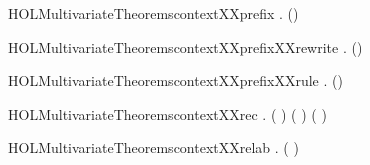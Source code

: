 \newcommand{\HOLMultivariateTheoremscontextXXparXXrule}{\UseVerbatim{HOLMultivariateTheoremscontextXXparXXrule}}
\begin{SaveVerbatim}{HOLMultivariateTheoremscontextXXprefix}
\HOLTokenTurnstile{} \HOLSymConst{\HOLTokenForall{}}  .   () \HOLSymConst{\HOLTokenImp{}}   
\end{SaveVerbatim}
\newcommand{\HOLMultivariateTheoremscontextXXprefix}{\UseVerbatim{HOLMultivariateTheoremscontextXXprefix}}
\begin{SaveVerbatim}{HOLMultivariateTheoremscontextXXprefixXXrewrite}
\HOLTokenTurnstile{} \HOLSymConst{\HOLTokenForall{}}  .   () \HOLSymConst{\HOLTokenEquiv{}}   
\end{SaveVerbatim}
\newcommand{\HOLMultivariateTheoremscontextXXprefixXXrewrite}{\UseVerbatim{HOLMultivariateTheoremscontextXXprefixXXrewrite}}
\begin{SaveVerbatim}{HOLMultivariateTheoremscontextXXprefixXXrule}
\HOLTokenTurnstile{} \HOLSymConst{\HOLTokenForall{}}  .    \HOLSymConst{\HOLTokenImp{}}   ()
\end{SaveVerbatim}
\newcommand{\HOLMultivariateTheoremscontextXXprefixXXrule}{\UseVerbatim{HOLMultivariateTheoremscontextXXprefixXXrule}}
\begin{SaveVerbatim}{HOLMultivariateTheoremscontextXXrec}
\HOLTokenTurnstile{} \HOLSymConst{\HOLTokenForall{}}  .
         (\HOLConst{\ensuremath{\mu}}  ) \HOLSymConst{\HOLTokenImp{}}
          \HOLSymConst{\HOLTokenConj{}}  ( ) ( )
\end{SaveVerbatim}
\newcommand{\HOLMultivariateTheoremscontextXXrec}{\UseVerbatim{HOLMultivariateTheoremscontextXXrec}}
\begin{SaveVerbatim}{HOLMultivariateTheoremscontextXXrelab}
\HOLTokenTurnstile{} \HOLSymConst{\HOLTokenForall{}}  .   (  ) \HOLSymConst{\HOLTokenImp{}}   
\end{SaveVerbatim}
